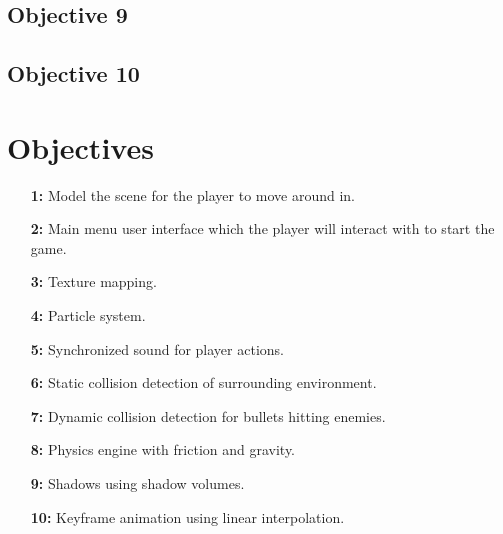 \documentclass {article}
\begin{document}
\subsection{Objective 9}
\cite{shadows}

\subsection{Objective 10}



\newpage

\section{Objectives}\label{sec:objectives}
\begin{enumerate}
    \item[\textbf{1:}]
    Model the scene for the player to move around in.

    \item[\textbf{2:}]
    Main menu user interface which the player will interact with to start the game.

    \item[\textbf{3:}]
    Texture mapping.

    \item[\textbf{4:}]
    Particle system.

    \item[\textbf{5:}]
    Synchronized sound for player actions.

    \item[\textbf{6:}]
    Static collision detection of surrounding environment.

    \item[\textbf{7:}]
    Dynamic collision detection for bullets hitting enemies.

    \item[\textbf{8:}]
    Physics engine with friction and gravity.

    \item[\textbf{9:}]
    Shadows using shadow volumes. %

    \item[\textbf{10:}]
    Keyframe animation using linear interpolation.
\end{enumerate}

\newpage
\printbibliography[heading=bibintoc, title={References}] %
\end{document}
